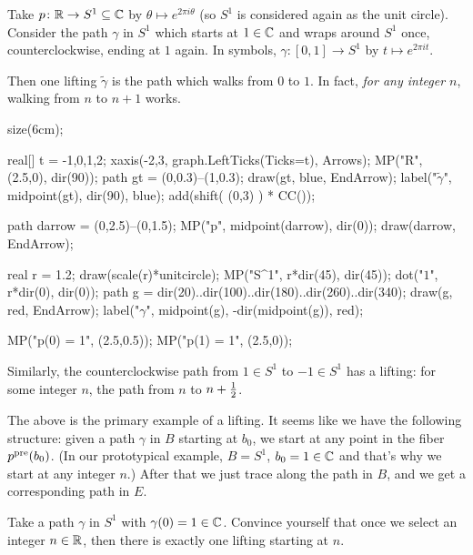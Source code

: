 \begin{example}
	Take $p \colon \mathbb R \to S^1 \subseteq \mathbb C$ by $\theta \mapsto e^{2 \pi i \theta}$
	(so $S^1$ is considered again as the unit circle).
	Consider the path $\gamma$ in $S^1$ which starts at $1 \in \mathbb C$
	and wraps around $S^1$ once, counterclockwise, ending at $1$ again.
	In symbols, $\gamma \colon [0,1] \to S^1$ by $t \mapsto e^{2\pi i t}$.

	Then one lifting $\tilde\gamma$ is the path which walks from $0$ to $1$.
	In fact, \emph{for any integer $n$}, walking from $n$ to $n+1$ works.

	\begin{center}
		\begin{asy}
			size(6cm);

			real[] t = {-1,0,1,2};
			xaxis(-2,3, graph.LeftTicks(Ticks=t), Arrows);
			MP("\mathbb R", (2.5,0), dir(90));
			path gt = (0,0.3)--(1,0.3);
			draw(gt, blue, EndArrow);
			label("$\tilde\gamma$", midpoint(gt), dir(90), blue);
			add(shift( (0,3) ) * CC());

			path darrow = (0,2.5)--(0,1.5);
			MP("p", midpoint(darrow), dir(0));
			draw(darrow, EndArrow);

			real r = 1.2;
			draw(scale(r)*unitcircle);
			MP("S^1", r*dir(45), dir(45));
			dot("$1$", r*dir(0), dir(0));
			path g = dir(20)..dir(100)..dir(180)..dir(260)..dir(340);
			draw(g, red, EndArrow);
			label("$\gamma$", midpoint(g), -dir(midpoint(g)), red);

			MP("p(0) = 1", (2.5,0.5));
			MP("p(1) = 1", (2.5,0));
		\end{asy}
	\end{center}

	Similarly, the counterclockwise path from $1 \in S^1$ to $-1 \in S^1$
	has a lifting: for some integer $n$, the path from $n$ to $n+\frac{1}{2}$.
	\label{ex:lifting_circle}
\end{example}

The above is the primary example of a lifting.
It seems like we have the following structure: given a path $\gamma$
in $B$ starting at $b_0$, we start at any point in the fiber $p^{\text{pre}}(b_0)$.
(In our prototypical example, $B = S^1$, $b_0 = 1 \in \mathbb C$
and that's why we start at any integer $n$.)
After that we just trace along the path in $B$, and we get
a corresponding path in $E$.
\begin{ques}
	Take a path $\gamma$ in $S^1$ with $\gamma(0) = 1 \in \mathbb C$.
	Convince yourself that once we select an integer $n \in \mathbb R$,
	then there is exactly one lifting starting at $n$.
\end{ques}

